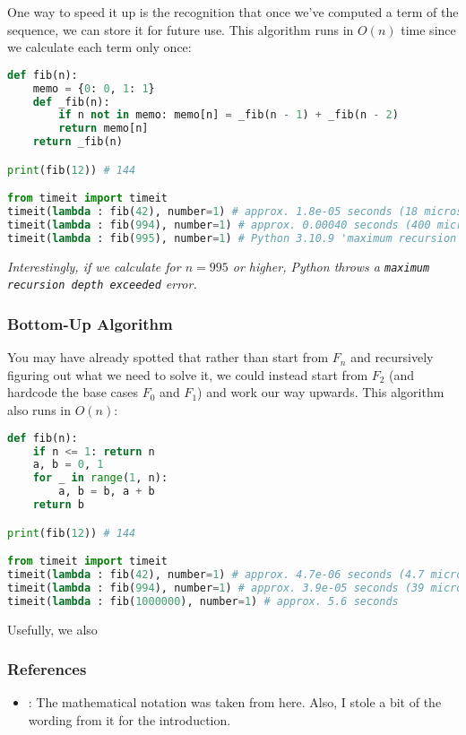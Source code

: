 One way to speed it up is the recognition that once we've computed a term of the sequence, we can store it for future use. This algorithm runs in $O(n)$ time since we calculate each term only once:
\begin{lstlisting}[language={python}, caption={Python code for a memoized recursion algorithm.}]
def fib(n):
    memo = {0: 0, 1: 1}
    def _fib(n):
        if n not in memo: memo[n] = _fib(n - 1) + _fib(n - 2)
        return memo[n]
    return _fib(n)

print(fib(12)) # 144

from timeit import timeit
timeit(lambda : fib(42), number=1) # approx. 1.8e-05 seconds (18 microseconds)
timeit(lambda : fib(994), number=1) # approx. 0.00040 seconds (400 microseconds)
timeit(lambda : fib(995), number=1) # Python 3.10.9 'maximum recursion depth exceeded' error
\end{lstlisting}

\emph{Interestingly, if we calculate for $n = 995$ or higher, Python throws a \texttt{maximum recursion depth exceeded} error.}


\subsubsection{Bottom-Up Algorithm}

You may have already spotted that rather than start from $F_n$ and recursively figuring out what we need to solve it, we could instead start from $F_2$ (and hardcode the base cases $F_0$ and $F_1$) and work our way upwards. This algorithm also runs in $O(n)$:
\begin{lstlisting}[language={python}, caption={Python code for a bottom-up algorithm.}]
def fib(n):
    if n <= 1: return n
    a, b = 0, 1
    for _ in range(1, n):
        a, b = b, a + b
    return b

print(fib(12)) # 144

from timeit import timeit
timeit(lambda : fib(42), number=1) # approx. 4.7e-06 seconds (4.7 microseconds)
timeit(lambda : fib(994), number=1) # approx. 3.9e-05 seconds (39 microseconds)
timeit(lambda : fib(1000000), number=1) # approx. 5.6 seconds
\end{lstlisting}

Usefully, we also 


\subsubsection{References}
\begin{itemize}
    \item \href{https://en.wikipedia.org/wiki/Fibonacci_sequence}{}: The mathematical notation was taken from here. Also, I stole a bit of the wording from it for the introduction.
\end{itemize}

